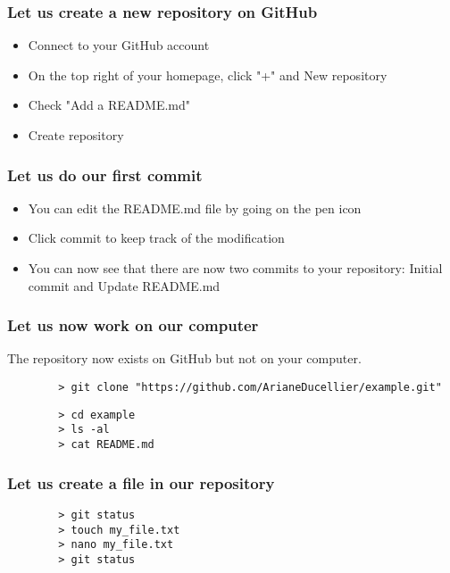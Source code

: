 \documentclass{beamer}
\begin{document}
	\begin{frame}
	\frametitle{Let us create a new repository on GitHub}
	\begin{itemize}
	\setlength\itemsep{1em}
		\item Connect to your GitHub account
		\item On the top right of your homepage, click "+" and New repository
		\item Check "Add a README.md"
		\item Create repository
	\end{itemize}
	\end{frame}

	\begin{frame}
	\frametitle{Let us do our first commit}
	\begin{itemize}
	\setlength\itemsep{1em}
		\item You can edit the README.md file by going on the pen icon
		\item Click commit to keep track of the modification
		\item You can now see that there are now two commits to your repository: Initial commit and Update README.md
	\end{itemize}
	\end{frame}

	\begin{frame}[fragile]
	\frametitle{Let us now work on our computer}
	The repository now exists on GitHub but not on your computer.
	\begin{exampleblock}{}
		\scriptsize{
		\begin{verbatim}
		> git clone "https://github.com/ArianeDucellier/example.git"
		\end{verbatim}
		}
	\end{exampleblock}

	\vspace{0.5cm}

	\begin{exampleblock}{}
		\begin{verbatim}
		> cd example
		> ls -al
		> cat README.md
		\end{verbatim}
	\end{exampleblock}
	\end{frame}

	\begin{frame}[fragile]
	\frametitle{Let us create a file in our repository}
	\begin{exampleblock}{}
		\begin{verbatim}
		> git status
		> touch my_file.txt
		> nano my_file.txt
		> git status
		\end{verbatim}
	\end{exampleblock}
	\end{frame}
\end{document}
